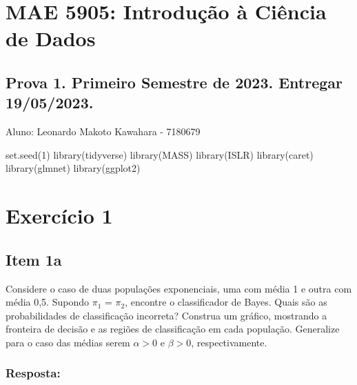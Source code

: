 \documentclass[
]{article}
\author{}
\date{\vspace{-2.5em}}
\newenvironment{Shaded}{\begin{snugshade}}{\end{snugshade}}
\newcommand{\DecValTok}[1]{\textcolor[rgb]{0.00,0.00,0.81}{#1}}
\newcommand{\FunctionTok}[1]{\textcolor[rgb]{0.00,0.00,0.00}{#1}}
\newcommand{\NormalTok}[1]{#1}
\begin{document}
\hypertarget{mae-5905-introduuxe7uxe3o-uxe0-ciuxeancia-de-dados}{%
\section{MAE 5905: Introdução à Ciência de
Dados}\label{mae-5905-introduuxe7uxe3o-uxe0-ciuxeancia-de-dados}}

\hypertarget{prova-1.-primeiro-semestre-de-2023.-entregar-19052023.}{%
\subsection{Prova 1. Primeiro Semestre de 2023. Entregar
19/05/2023.}\label{prova-1.-primeiro-semestre-de-2023.-entregar-19052023.}}

Aluno: Leonardo Makoto Kawahara - 7180679

\begin{Shaded}
\begin{Highlighting}[]
\FunctionTok{set.seed}\NormalTok{(}\DecValTok{1}\NormalTok{)}
\FunctionTok{library}\NormalTok{(tidyverse)}
\FunctionTok{library}\NormalTok{(MASS)}
\FunctionTok{library}\NormalTok{(ISLR)}
\FunctionTok{library}\NormalTok{(caret)}
\FunctionTok{library}\NormalTok{(glmnet)}
\FunctionTok{library}\NormalTok{(ggplot2)}
\end{Highlighting}
\end{Shaded}

\hypertarget{exercuxedcio-1}{%
\section{Exercício 1}\label{exercuxedcio-1}}

\hypertarget{item-1a}{%
\subsection{Item 1a}\label{item-1a}}

Considere o caso de duas populações exponenciais, uma com média 1 e
outra com média 0,5. Supondo \(\pi_1\) = \(\pi_2\), encontre o
classificador de Bayes. Quais são as probabilidades de classificação
incorreta? Construa um gráfico, mostrando a fronteira de decisão e as
regiões de classificação em cada população. Generalize para o caso das
médias serem \(\alpha > 0\) e \(\beta > 0\), respectivamente.

\hypertarget{resposta}{%
\subsubsection{Resposta:}\label{resposta}}
\end{document}
